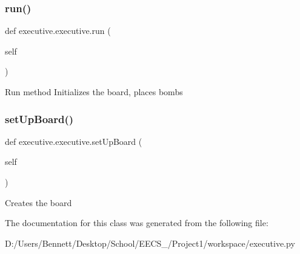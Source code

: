 \subsubsection{\texorpdfstring{run()}{run()}}
{\footnotesize\ttfamily def executive.\+executive.\+run (\begin{DoxyParamCaption}\item[{}]{self }\end{DoxyParamCaption})}

\begin{DoxyVerb}Run method
Initializes the board, places bombs
\end{DoxyVerb}
 \mbox{\label{classexecutive_1_1executive_ae2161d95542ae653323bbfb9ae0ac27b}} 
\subsubsection{\texorpdfstring{set\+Up\+Board()}{setUpBoard()}}
{\footnotesize\ttfamily def executive.\+executive.\+set\+Up\+Board (\begin{DoxyParamCaption}\item[{}]{self }\end{DoxyParamCaption})}

\begin{DoxyVerb}Creates the board
\end{DoxyVerb}
 

The documentation for this class was generated from the following file\+:\begin{DoxyCompactItemize}
\item 
D\+:/\+Users/\+Bennett/\+Desktop/\+School/\+E\+E\+C\+S\+\_/\+Project1/workspace/executive.\+py\end{DoxyCompactItemize}

